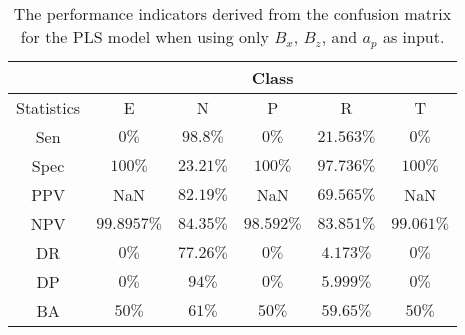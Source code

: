 \begin{table}[!ht]
	\centering
	\begin{tabular}{|c|c|c|c|c|c|}
		\hline
		 & \multicolumn{5}{c|}{Class} \\ \hline
		Statistics & E & N & P & R & T \\ \hline
		Sen & $0\%$ & $98.8\%$ & $0\%$ & $21.563\%$ & $0\%$ \\ \hline
		Spec & $100\%$ & $23.21\%$ & $100\%$ & $97.736\%$ & $100\%$ \\ \hline
		PPV & NaN & $82.19\%$ & NaN & $69.565\%$ & NaN \\ \hline
		NPV & $99.8957\%$ & $84.35\%$ & $98.592\%$ & $83.851\%$ & $99.061\%$ \\ \hline
		DR & $0\%$ & $77.26\%$ & $0\%$ & $4.173\%$ & $0\%$ \\ \hline
		DP & $0\%$ & $94\%$ & $0\%$ & $5.999\%$ & $0\%$ \\ \hline
		BA & $50\%$ & $61\%$ & $50\%$ & $59.65\%$ & $50\%$ \\ \hline
	\end{tabular}
	\caption{The performance indicators derived from the confusion matrix for the PLS model when using only $B_{x}$, $B_{z}$, and $a_{p}$ as input.}
	\label{tab:cs:reverse:xzap:pls}
\end{table}

